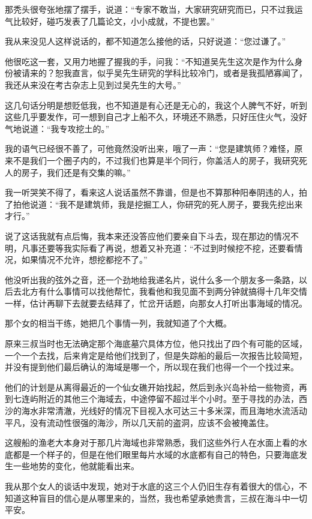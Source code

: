 那秃头很夸张地摆了摆手，说道：“专家不敢当，大家研究研究而已，只不过我运气比较好，碰巧发表了几篇论文，小小成就，不提也罢。”

我从来没见人这样说话的，都不知道怎么接他的话，只好说道：“您过谦了。”

他很吃这一套，又用力地握了握我的手，问我：“不知道吴先生这次是作为什么身份被请来的？恕我直言，似乎吴先生研究的学科比较冷门，或者是我孤陋寡闻了，我还从来没在考古杂志上见到过吴先生的大号。”

这几句话分明是想贬低我，也不知道是有心还是无心的，我这个人脾气不好，听到这些几乎要发作，可一想到自己才上船不久，环境还不熟悉，只好压住火气，没好气地说道：“我专攻挖土的。”

我的语气已经很不善了，可他竟然没听出来，哦了一声：“您是建筑师？难怪，原来不是我们一个圈子内的，不过我们也算是半个同行，你盖活人的房子，我研究死人的房子，我们还是有交集的嘛。”

我一听哭笑不得了，看来这人说话虽然不靠谱，但是也不算那种阳奉阴违的人，拍了拍他说道：“我不是建筑师，我是挖掘工人，你研究的死人房子，要我先挖出来才行。”

说了这话我就有点后悔，我本来还没答应他们要亲自下斗去，现在那边的情况不明，凡事还要等我实际看了再说，想着又补充道：“不过到时候挖不挖，还要看情况，如果情况不允许，想挖都挖不了。”

他没听出我的弦外之音，还一个劲地给我递名片，说什么多一个朋友多一条路，以后去北方有什么事情可以找他帮忙，我看他和我见面不到两分钟就搞得十几年交情一样，估计再聊下去就要去结拜了，忙岔开话题，向那女人打听出事海域的情况。

那个女的相当干练，她把几个事情一列，我就知道了个大概。

原来三叔当时也无法确定那个海底墓穴具体方位，他只找出了四个有可能的区域，一个一个去找，后来肯定是给他们找到了，但是失踪船的最后一次报告比较简短，并没有提到他们最后确认的海域是哪一个，所以现在我们也得一个一个找过来。

他们的计划是从离得最近的一个仙女礁开始找起，然后到永兴岛补给一些物资，再到七连屿附近的其他三个海域去，中途停留不超过半个小时。至于寻找的办法，西沙的海水非常清澈，光线好的情况下目视入水可达三十多米深，而且海地水流活动平凡，没有流动性很强的海沙，所以几天前的盗洞，应该不会被掩盖住。

这艘船的渔老大本身对于那几片海域也非常熟悉，我们这些外行人在水面上看的水底都是一个样子的，但是在他们眼里每片水域的水底都有自己的特色，只要海底发生一些地势的变化，他就能看出来。

我从那个女人的谈话中发现，她对于水底的这三个人仍旧生存有着很大的信心，不知道这种盲目的信心是从哪里来的，当然，我也希望承她贵言，三叔在海斗中一切平安。

